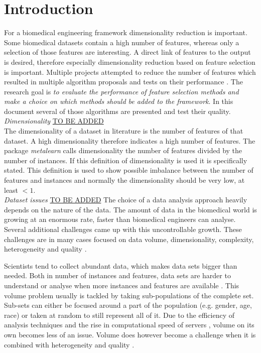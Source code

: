 \documentclass[10pt,a4paper]{report}
\begin{document}
	\section{Introduction}
	\label{FSsec:Introduction}
	
	For a biomedical engineering framework dimensionality reduction is important.  Some biomedical datasets contain a high number of features, whereas only a selection of those features are interesting. A direct link of features to the output is desired, therefore especially dimensionality reduction based on feature selection is important. Multiple projects attempted to reduce the number of features \cite{baumgartner2006data, welthagen2005comprehensive} which resulted in multiple algorithm proposals \cite{lim2003planar, peng2010novel, biesiada2007feature, ding2005minimum} and tests on their performance \cite{catal2009investigating, liu2002comparative}. The research goal is \emph{to evaluate the performance of feature selection methods and make a choice on which methods should be added to the framework}. In this document several of those algorithms are presented and test their quality.
	\\
	\textit{Dimensionality} \underline{TO BE ADDED}\\
	The dimensionality of a dataset in literature is the number of features of that dataset\cite{yu2003feature,lim2003planar,biesiada2007feature}. A high dimensionality therefore indicates a high number of features. The package \textit{metalearn} calls dimensionality the number of features divided by the number of instances. If this definition of dimensionality is used it is specifically stated. This definition is used to show possible imbalance between the number of features and instances and normally the dimensionality should be very low, at least $<1$.
	\\	
	\textit{Dataset issues} \underline{TO BE ADDED}
	The choice of a data analysis approach heavily depends on the nature of the data. The amount of data in the biomedical world is growing at an enormous rate, faster than biomedical engineers can analyse. Several additional challenges came up with this uncontrollable growth. These challenges are in many cases focused on data volume, dimensionality, complexity, heterogeneity and quality \cite{chen2006medical, doi:10.1093/bib/bbx044}.
	
	Scientists tend to collect abundant data, which makes data sets bigger than needed. Both in number of instances and features, data sets are harder to understand or analyse when more instances and features are available \cite{chen2006medical}. This volume problem usually is tackled by taking sub-populations of the complete set. Sub-sets can either be focused around a part of the population (e.g. gender, age, race) or taken at random to still represent all of it. Due to the efficiency of analysis techniques and the rise in computational speed of servers \cite{blythe2008rise}, volume on its own becomes less of an issue. Volume does however become a challenge when it is combined with heterogeneity and quality \cite{Turkay2014, Holzinger2014}.
	
\end{document}
